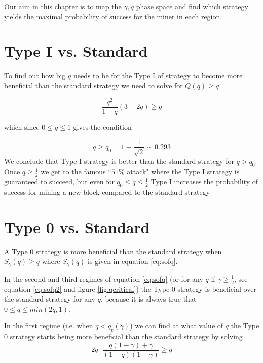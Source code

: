 \documentclass[letterpaper,12pt]{report}
\begin{document}
Our aim in this chapter is to map the $\gamma,q$ phase space and find which strategy yields the maximal probability of success for the miner in each region.

\section{Type I vs. Standard}\label{TypeIoverStandard}
To find out how big $q$ needs to be for the Type I of strategy to become more beneficial than the standard strategy we need to solve for $Q(q)\geq q$

\begin{equation}\label{eq:type1overstandard}
\dfrac{q^2}{1-q}\left(3-2q\right) \geq q
\end{equation}

which since $0\leq q \leq 1$ gives the condition 

\begin{equation}\label{eq:qnot}
q\geq q_0=1-\frac{1}{\sqrt{2}} \sim 0.293
\end{equation}
We conclude that Type I strategy is better than the standard strategy for $q>q_0$. Once $q\geq \frac{1}{2}$ we get to the famous ``$51\%$ attack" where the Type I strategy is guaranteed to succeed, but even for $q_0\leq q \leq \frac{1}{2}$ Type I increases the probability of success for mining a new block compared to the standard strategy

\section{Type 0 vs. Standard}\label{Type0overStandard}

A Type 0 strategy is more beneficial than the standard strategy when $S_\gamma(q)\geq q$ where $S_\gamma(q)$ is given in equation \ref{eq:sofq}. 

In the second and third regimes of equation \ref{eq:sofq} (or for any $q$ if $\gamma\geq\frac{1}{2}$, see equation \ref{eq:sofq2} and figure \ref{fig:qcritical}) the Type 0 strategy is beneficial over the standard strategy for any $q$, because it is always true that $0\leq q \leq min(2q,1)$. 

In the first regime (i.e. when $q<q_c(\gamma)$) we can find at what value of $q$ the Type 0 strategy starts being more beneficial than the standard strategy by solving
\begin{equation}\label{eq:type0benefitonhonestequation}
2q\cdot\frac{q(1-\gamma)+\gamma}{(1-q)(1-\gamma)}\geq q
\end{equation}
\end{document}
